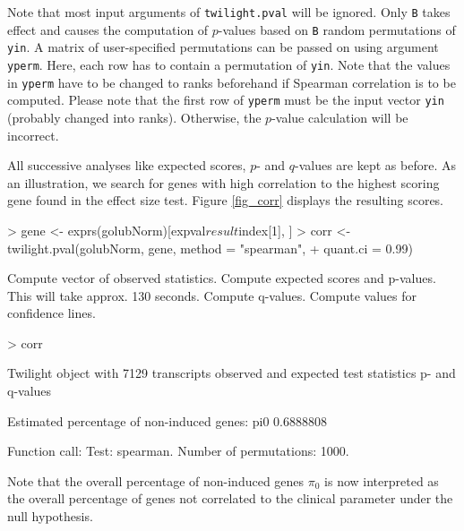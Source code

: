 \documentclass[11pt,a4paper,fleqn]{report}
\newcommand{\Rfunction}[1]{{\texttt{#1}}}
\newcommand{\Rfunarg}[1]{{\texttt{#1}}}
\begin{document}
Note that most input arguments of \Rfunction{twilight.pval} will be ignored. Only \Rfunarg{B} takes effect and causes the computation of $p$-values based on \Rfunarg{B} random permutations of \Rfunarg{yin}. A matrix of user-specified permutations can be passed on using argument \Rfunarg{yperm}. Here, each row has to contain a permutation of \Rfunarg{yin}. Note that the values in \Rfunarg{yperm} have to be changed to ranks beforehand if Spearman correlation is to be computed. Please note that the first row of \Rfunarg{yperm} must be the input vector \Rfunarg{yin} (probably changed into ranks). Otherwise, the $p$-value calculation will be incorrect.

All successive analyses like expected scores, $p$- and $q$-values are kept as before. As an illustration, we search for genes with high correlation to the highest scoring gene found in the effect size test. Figure \ref{fig_corr} displays the resulting scores.

\begin{Schunk}
\begin{Sinput}
> gene <- exprs(golubNorm)[expval$result$index[1], ]
> corr <- twilight.pval(golubNorm, gene, method = "spearman", 
+     quant.ci = 0.99)
\end{Sinput}
\begin{Soutput}
Compute vector of observed statistics. 
Compute expected scores and p-values. This will take approx. 130 seconds. 
Compute q-values. 
Compute values for confidence lines. 
\end{Soutput}
\begin{Sinput}
> corr
\end{Sinput}
\begin{Soutput}
 Twilight object with
     7129 transcripts
     observed and expected test statistics
     p- and q-values

 Estimated percentage of non-induced genes:
      pi0 
0.6888808 

 Function call:
 Test: spearman. Number of permutations: 1000. 
\end{Soutput}
\end{Schunk}

Note that the overall percentage of non-induced genes $\pi_0$ is now interpreted as the overall percentage of genes not correlated to the clinical parameter under the null hypothesis.
\end{document}
